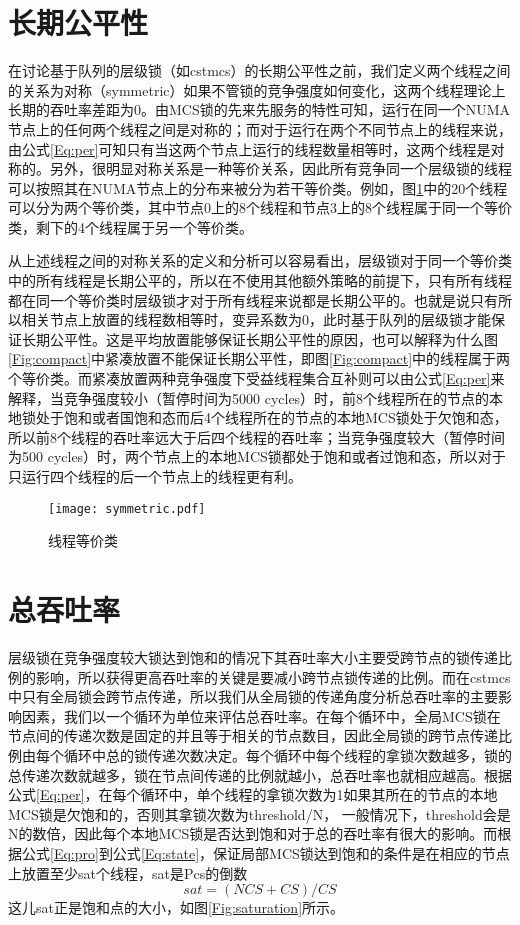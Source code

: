 \section{长期公平性}
在讨论基于队列的层级锁（如cstmcs）的长期公平性之前，我们定义两个线程之间的关系为对称（symmetric）如果不管锁的竞争强度如何变化，这两个线程理论上长期的吞吐率差距为0。由MCS锁的先来先服务的特性可知，运行在同一个NUMA节点上的任何两个线程之间是对称的；而对于运行在两个不同节点上的线程来说，由公式\ref{Eq:per}可知只有当这两个节点上运行的线程数量相等时，这两个线程是对称的。另外，很明显对称关系是一种等价关系，因此所有竞争同一个层级锁的线程可以按照其在NUMA节点上的分布来被分为若干等价类。例如，图\ref{Fig:symmetric}中的20个线程可以分为两个等价类，其中节点0上的8个线程和节点3上的8个线程属于同一个等价类，剩下的4个线程属于另一个等价类。

从上述线程之间的对称关系的定义和分析可以容易看出，层级锁对于同一个等价类中的所有线程是长期公平的，所以在不使用其他额外策略的前提下，只有所有线程都在同一个等价类时层级锁才对于所有线程来说都是长期公平的。也就是说只有所以相关节点上放置的线程数相等时，变异系数为0，此时基于队列的层级锁才能保证长期公平性。这是平均放置能够保证长期公平性的原因，也可以解释为什么图\ref{Fig:compact}中紧凑放置不能保证长期公平性，即图\ref{Fig:compact}中的线程属于两个等价类。而紧凑放置两种竞争强度下受益线程集合互补则可以由公式\ref{Eq:per}来解释，当竞争强度较小（暂停时间为5000 cycles）时，前8个线程所在的节点的本地锁处于饱和或者国饱和态而后4个线程所在的节点的本地MCS锁处于欠饱和态，所以前8个线程的吞吐率远大于后四个线程的吞吐率；当竞争强度较大（暂停时间为500 cycles）时，两个节点上的本地MCS锁都处于饱和或者过饱和态，所以对于只运行四个线程的后一个节点上的线程更有利。

\begin{figure}[t]
	\centering
	\texttt{[image: symmetric.pdf]}
	\caption{线程等价类}
	\label{Fig:symmetric}
\end{figure}

\section{总吞吐率}
层级锁在竞争强度较大锁达到饱和的情况下其吞吐率大小主要受跨节点的锁传递比例的影响，所以获得更高吞吐率的关键是要减小跨节点锁传递的比例。而在cstmcs中只有全局锁会跨节点传递，所以我们从全局锁的传递角度分析总吞吐率的主要影响因素，我们以一个循环为单位来评估总吞吐率。在每个循环中，全局MCS锁在节点间的传递次数是固定的并且等于相关的节点数目，因此全局锁的跨节点传递比例由每个循环中总的锁传递次数决定。每个循环中每个线程的拿锁次数越多，锁的总传递次数就越多，锁在节点间传递的比例就越小，总吞吐率也就相应越高。根据公式\ref{Eq:per}，在每个循环中，单个线程的拿锁次数为1如果其所在的节点的本地MCS锁是欠饱和的，否则其拿锁次数为threshold/N， 一般情况下，threshold会是N的数倍，因此每个本地MCS锁是否达到饱和对于总的吞吐率有很大的影响。而根据公式\ref{Eq:pro}到公式\ref{Eq:state}，保证局部MCS锁达到饱和的条件是在相应的节点上放置至少sat个线程，sat是Pcs的倒数
\begin{equation}\label{Eq:sat}
     sat = (NCS + CS) / CS
\end{equation}
这儿sat正是饱和点的大小，如图\ref{Fig:saturation}所示。

